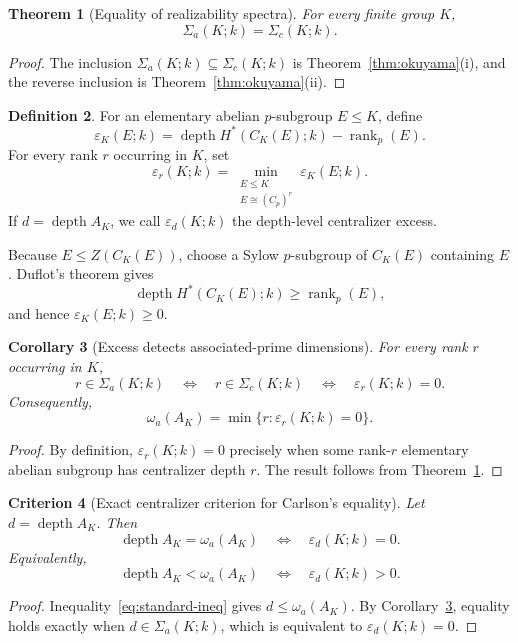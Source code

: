 \documentclass[11pt]{amsart}
\newtheorem{theorem}{Theorem}[section]
\newtheorem{corollary}[theorem]{Corollary}
\newtheorem{criterion}[theorem]{Criterion}
\theoremstyle{definition}
\newtheorem{definition}[theorem]{Definition}
\theoremstyle{remark}
\DeclareMathOperator{\depth}{depth}
\DeclareMathOperator{\rank}{rank}
\begin{document}
\begin{theorem}[Equality of realizability spectra]
\label{thm:spectra-equality}
For every finite group $K$,
\[
\Sigma_a(K;k)=\Sigma_c(K;k).
\]
\end{theorem}

\begin{proof}
The inclusion $\Sigma_a(K;k)\subseteq\Sigma_c(K;k)$ is Theorem~\ref{thm:okuyama}(i), and the reverse inclusion is Theorem~\ref{thm:okuyama}(ii).
\end{proof}

\begin{definition}
\label{def:excess}
For an elementary abelian $p$-subgroup $E\leq K$, define
\[
\varepsilon_K(E;k)=\depth H^*(C_K(E);k)-\rank_p(E).
\]
For every rank $r$ occurring in $K$, set
\[
\varepsilon_r(K;k)=
\min_{\substack{E\leq K\\E\cong(C_p)^r}}
\varepsilon_K(E;k).
\]
If $d=\depth A_K$, we call $\varepsilon_d(K;k)$ the depth-level centralizer excess.
\end{definition}

Because $E\leq Z(C_K(E))$, choose a Sylow $p$-subgroup of $C_K(E)$ containing $E$.  Duflot's theorem gives
\[
\depth H^*(C_K(E);k)\geq\rank_p(E),
\]
and hence $\varepsilon_K(E;k)\geq0$.

\begin{corollary}[Excess detects associated-prime dimensions]
\label{cor:excess-spectrum}
For every rank $r$ occurring in $K$,
\[
r\in\Sigma_a(K;k)
\quad\Longleftrightarrow\quad
r\in\Sigma_c(K;k)
\quad\Longleftrightarrow\quad
\varepsilon_r(K;k)=0.
\]
Consequently,
\[
\omega_a(A_K)=\min\{r:\varepsilon_r(K;k)=0\}.
\]
\end{corollary}

\begin{proof}
By definition, $\varepsilon_r(K;k)=0$ precisely when some rank-$r$ elementary abelian subgroup has centralizer depth $r$.  The result follows from Theorem~\ref{thm:spectra-equality}.
\end{proof}

\begin{criterion}[Exact centralizer criterion for Carlson's equality]
\label{crit:rank-obstruction}
Let $d=\depth A_K$.  Then
\[
\depth A_K=\omega_a(A_K)
\quad\Longleftrightarrow\quad
\varepsilon_d(K;k)=0.
\]
Equivalently,
\[
\depth A_K<\omega_a(A_K)
\quad\Longleftrightarrow\quad
\varepsilon_d(K;k)>0.
\]
\end{criterion}

\begin{proof}
Inequality~\eqref{eq:standard-ineq} gives $d\leq\omega_a(A_K)$.  By Corollary~\ref{cor:excess-spectrum}, equality holds exactly when $d\in\Sigma_a(K;k)$, which is equivalent to $\varepsilon_d(K;k)=0$.
\end{proof}
\end{document}
